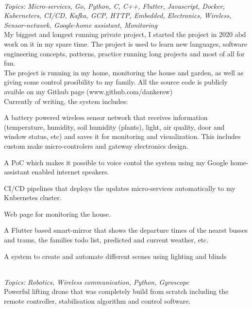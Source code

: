  \\
\emph{Topics: Micro-services, Go, Python, C, C++, Flutter, Javascript, Docker, Kuberneters, CI/CD, Kafka, GCP, HTTP, Embedded, Electronics, Wireless, Sensor-network, Google-home assistant, Monitoring} \\
My biggest and longest running private project, I started the project in 2020 abd work on it in my spare time. The project is used to learn new languages, software engineering concepts, patterns, practice running long projects and most of all for fun. \\

The project is running in my home, monitoring the house and garden, as well as giving some control prosibility to my family. All the source code is publicly avaible on my Github page (www.github.com/dankersw) \\

Currently of writing, the system includes:
\begin{compactitem}[\color{RoyalBlue}$\circ$]
    \item A battery powered wireless sensor network that receives information (temperature, humidity, soil humidity (plants), light, air quality, door and window status, etc) and saves it for monitoring and visualization. This includes custom make micro-controlers and gateway electronics design.
    \item A PoC which makes it possible to voice contol the system using my Google home-assistant enabled internet speakers.
    \item CI/CD pipelines that deploys the updates micro-services automatically to my Kubernetes cluster.
    \item Web page for monitoring the house.
    \item A Flutter based smart-mirror that shows the departure times of the nearst busses and trams, the families todo list, predicted and current weather, etc.
    \item A system to create and automate different scenes using lighting and blinds
\end{compactitem}
\SmallSep

 \\
\emph{Topics: Robotics, Wireless communication, Python, Gyroscope} \\
Powerful lifting drone that was completely build from scratch including the remote controller, stabilisation algorithm and control software.
\Sep
